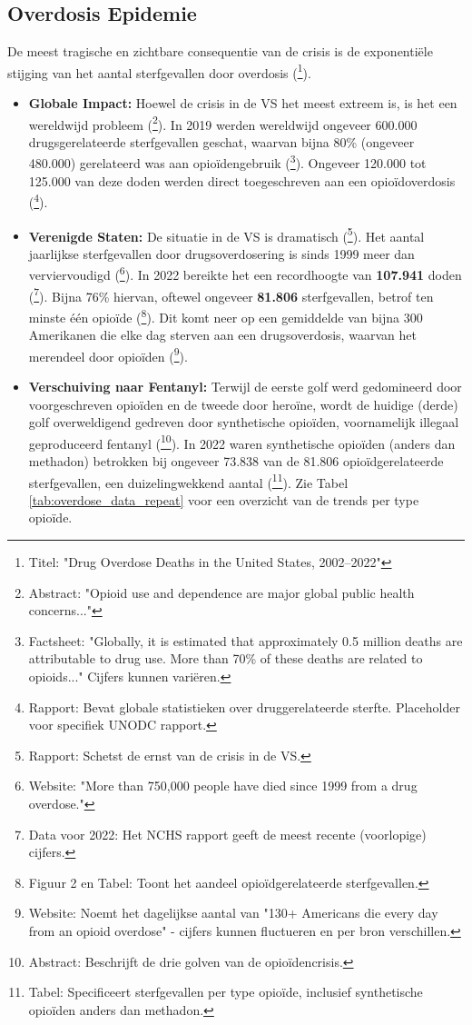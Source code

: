 \documentclass[11pt, a4paper]{report} %
\begin{document}
\subsection{Overdosis Epidemie}
De meest tragische en zichtbare consequentie van de crisis is de exponentiële stijging van het aantal sterfgevallen door overdosis (\cite{CDC2024DataBrief491}\footnote{Titel: "Drug Overdose Deaths in the United States, 2002–2022"}).
\begin{itemize}
    \item \textbf{Globale Impact:} Hoewel de crisis in de VS het meest extreem is, is het een wereldwijd probleem (\cite{Degenhardt2019GlobalPatterns}\footnote{Abstract: "Opioid use and dependence are major global public health concerns..."}). In 2019 werden wereldwijd ongeveer 600.000 drugsgerelateerde sterfgevallen geschat, waarvan bijna 80\% (ongeveer 480.000) gerelateerd was aan opioïdengebruik (\cite{WHO2023Opioid}\footnote{Factsheet: "Globally, it is estimated that approximately 0.5 million deaths are attributable to drug use. More than 70\% of these deaths are related to opioids..." Cijfers kunnen variëren.}). Ongeveer 120.000 tot 125.000 van deze doden werden direct toegeschreven aan een opioïdoverdosis (\cite{UNODCWorldDrugReport2021}\footnote{Rapport: Bevat globale statistieken over druggerelateerde sterfte. Placeholder voor specifiek UNODC rapport.}).
    \item \textbf{Verenigde Staten:} De situatie in de VS is dramatisch (\cite{CRS2022OpioidCrisisHistory}\footnote{Rapport: Schetst de ernst van de crisis in de VS.}). Het aantal jaarlijkse sterfgevallen door drugsoverdosering is sinds 1999 meer dan verviervoudigd (\cite{CDCUnderstandingEpidemic}\footnote{Website: "More than 750,000 people have died since 1999 from a drug overdose."}). In 2022 bereikte het een recordhoogte van \textbf{107.941} doden (\cite{Ahmad2024ProvisionalOverdoseDeaths}\footnote{Data voor 2022: Het NCHS rapport geeft de meest recente (voorlopige) cijfers.}). Bijna 76\% hiervan, oftewel ongeveer \textbf{81.806} sterfgevallen, betrof ten minste één opioïde (\cite{CDC2024DataBrief491}\footnote{Figuur 2 en Tabel: Toont het aandeel opioïdgerelateerde sterfgevallen.}). Dit komt neer op een gemiddelde van bijna 300 Amerikanen die elke dag sterven aan een drugsoverdosis, waarvan het merendeel door opioïden (\cite{FCCConnect2HealthOpioids}\footnote{Website: Noemt het dagelijkse aantal van "130+ Americans die every day from an opioid overdose" - cijfers kunnen fluctueren en per bron verschillen.}).
    \item \textbf{Verschuiving naar Fentanyl:} Terwijl de eerste golf werd gedomineerd door voorgeschreven opioïden en de tweede door heroïne, wordt de huidige (derde) golf overweldigend gedreven door synthetische opioïden, voornamelijk illegaal geproduceerd fentanyl (\cite{Ciccarone2019TripleWave}\footnote{Abstract: Beschrijft de drie golven van de opioïdencrisis.}). In 2022 waren synthetische opioïden (anders dan methadon) betrokken bij ongeveer 73.838 van de 81.806 opioïdgerelateerde sterfgevallen, een duizelingwekkend aantal (\cite{CDC2024DataBrief491}\footnote{Tabel: Specificeert sterfgevallen per type opioïde, inclusief synthetische opioïden anders dan methadon.}). Zie Tabel \ref{tab:overdose_data_repeat} voor een overzicht van de trends per type opioïde.

\end{itemize}
\end{document}
